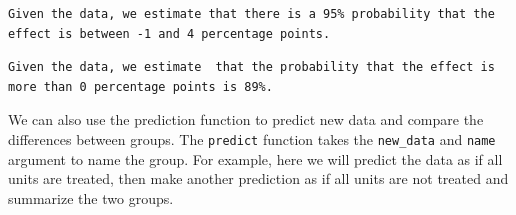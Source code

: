\documentclass[
  letterpaper,
  DIV=11,
  numbers=noendperiod]{scrreprt}
\newenvironment{Shaded}{\begin{snugshade}}{\end{snugshade}}
\newcommand{\AttributeTok}[1]{\textcolor[rgb]{0.40,0.45,0.13}{#1}}
\newcommand{\ConstantTok}[1]{\textcolor[rgb]{0.56,0.35,0.01}{#1}}
\newcommand{\DecValTok}[1]{\textcolor[rgb]{0.68,0.00,0.00}{#1}}
\newcommand{\FloatTok}[1]{\textcolor[rgb]{0.68,0.00,0.00}{#1}}
\newcommand{\FunctionTok}[1]{\textcolor[rgb]{0.28,0.35,0.67}{#1}}
\newcommand{\NormalTok}[1]{\textcolor[rgb]{0.00,0.23,0.31}{#1}}
\newcommand{\OtherTok}[1]{\textcolor[rgb]{0.00,0.23,0.31}{#1}}
\newcommand{\SpecialCharTok}[1]{\textcolor[rgb]{0.37,0.37,0.37}{#1}}
\newcommand{\StringTok}[1]{\textcolor[rgb]{0.13,0.47,0.30}{#1}}
\begin{document}
\begin{verbatim}
Given the data, we estimate that there is a 95% probability that the effect is between -1 and 4 percentage points.
\end{verbatim}

\begin{Shaded}
\end{Shaded}

\begin{verbatim}
Given the data, we estimate  that the probability that the effect is more than 0 percentage points is 89%.
\end{verbatim}

We can also use the prediction function to predict new data and compare
the differences between groups. The \texttt{predict} function takes the
\texttt{new\_data} and \texttt{name} argument to name the group. For
example, here we will predict the data as if all units are treated, then
make another prediction as if all units are not treated and summarize
the two groups.

\begin{Shaded}
\end{Shaded}
\end{document}
